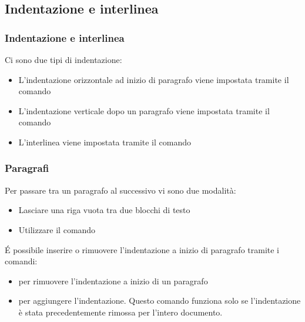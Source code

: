 \subsection{Indentazione e interlinea}


\begin{frame}[fragile]
 \frametitle{Indentazione e interlinea}
 
  Ci sono due tipi di indentazione:
  \begin{itemize}
    \item<1-> L'indentazione orizzontale ad inizio di paragrafo viene impostata tramite il comando \inline{\setlength{\parindent}{#em}}
    \item<2-> L'indentazione verticale dopo un paragrafo viene impostata tramite il comando \inline{\setlength{\parskip}{#em}}
    \item<3-> L'interlinea viene impostata tramite il comando \inline{\renewcommand{\baselinestretch}{1.5}}
  \end{itemize}
  \vspace{5mm}

 
 
 
\end{frame}

\begin{frame}[fragile]
 \frametitle{Paragrafi}
 Per passare tra un paragrafo al successivo vi sono due modalità:
 \begin{itemize}
     \item Lasciare una riga vuota tra due blocchi di testo
     \item Utilizzare il comando \inline{\par}
 \end{itemize}
 \vspace{5mm}
 \'E possibile inserire o rimuovere l'indentazione a inizio di paragrafo tramite i comandi:
 \begin{itemize}
     \item \inline{\noindent} per rimuovere l'indentazione a inizio di un paragrafo
     \item \inline{\indent} per aggiungere l'indentazione. Questo comando funziona solo se l'indentazione è stata precedentemente rimossa per l'intero documento.
 \end{itemize}
 
 
\end{frame}
